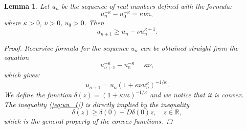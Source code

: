 \documentclass[1p]{article}
\newtheorem{lemma}{Lemma}
\begin{document}
\begin{lemma}
    \label{lem:u_sequence}
    Let $u_n$ be the sequence of real numbers defined with the formula:
    \[
        u_n^{-\kappa} - u_0^{-\kappa} = \kappa \nu n,
    \]
    where $\kappa > 0$, $\nu > 0$, $u_0 > 0$. Then
    \begin{equation}
        \label{eq:un_1}
        u_{n+1} \geq u_n - \nu u_n^{\kappa+1}.
    \end{equation}
    \begin{proof}
        Recursive formula for the sequence $u_n$ can be obtained straight from the equation
        \[
            u_{n+1}^{-\kappa} - u_n^{-\kappa} = \kappa \nu,
        \]
        which gives:
        \[
            u_{n+1} = u_n \left( 1 + \kappa \nu u_n^\kappa \right)^{-1/\kappa}.
        \]
        We define the function $\delta(z) = (1+\kappa \nu z)^{-1/\kappa}$ and we notice that it is convex. The inequality (\ref{eq:un_1}) is directly implied by the inequality 
        \[
            \delta(z) \geq \delta(0) + D\delta(0) z, \quad z \in \mathbb{R},
        \]
        which is the general property of the convex functions.
    \end{proof}
\end{lemma}
\end{document}
